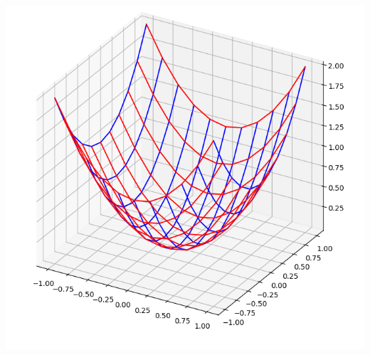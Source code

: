 \documentclass[11pt,class=report,crop=false]{standalone}
\begin{document}
\begin{activite}[Surfaces]
\begin{enumerate}
\begin{enumerate}
\begin{center}
	  	\includegraphics[scale=\myscale,scale=0.21]{ecran-surface-9}
	  \end{center}
	\end{enumerate}
\end{enumerate}



\end{activite}




\end{document}
